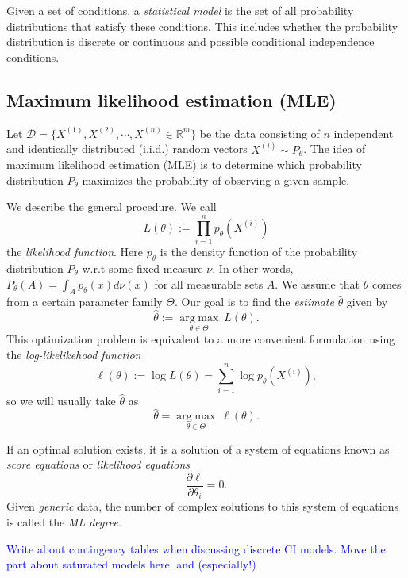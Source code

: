 \documentclass[10pt,a4paper]{article}
\begin{document}
Given a set of conditions, a \emph{statistical model} is the set of all probability distributions that satisfy these conditions. This includes whether the probability distribution is discrete or continuous and possible conditional independence conditions.

\subsection{Maximum likelihood estimation (MLE) }
Let $\mathcal{D}=\{X^{(1)},X^{(2)},\cdots,X^{(n)} \in \mathbb{R}^m\}$ be the data consisting of $n$ independent and identically distributed (i.i.d.) random vectors $X^{(i)}\sim P_\theta$. The idea of maximum likelihood estimation (MLE) is to determine which probability distribution $P_\theta$ maximizes the probability of observing a given sample. 

We describe the general procedure. We call
\[L(\theta):=\prod_{i=1}^np_\theta(X^{(i)})\]
the \emph{likelihood function}. Here $p_\theta$ is the density function of the probability distribution $P_\theta$ w.r.t some fixed measure $\nu$. In other words, $P_\theta(A)=\int_A p_\theta(x)d\nu(x)$ for all measurable sets $A$. We assume that $\theta$ comes from a certain parameter family $\Theta$. Our goal is to find the \emph{estimate} $\hat{\theta}$ given by
\[\hat{\theta} := \underset{\theta\in\Theta}{\operatorname{arg\;max}}\ L(\theta).\]
This optimization problem is equivalent to a more convenient formulation using the \emph{log-likelikehood function}
\begin{equation}\label{log-likelihood function}
\ell(\theta):= \log L(\theta)=\sum_{i=1}^n \log p_\theta(X^{(i)}),
\end{equation}
so we will usually take $\hat{\theta}$ as
\begin{equation}\label{optimization problem}
\hat{\theta} = \underset{\theta\in\Theta}{\operatorname{arg\;max}}\ \ell(\theta).
\end{equation}


If an optimal solution exists, it is a solution of a system of equations known as \emph{score equations} or \emph{likelihood equations}
\[\frac{\partial \ell}{\partial \theta_i}=0.\]
Given \emph{generic} data, the number of complex solutions to this system of equations is called the \emph{ML degree}.

\textcolor{blue}{Write about contingency tables when discussing discrete CI models.    Move the part about saturated models here. \cite[Chapter 1]{drton2008lectures} and (especially!) \cite[p.69]{lauritzen1996graphical}}
\end{document}

